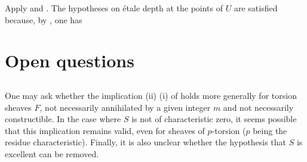 Apply  and . The hypotheses on \'{e}tale depth at the points of $U$ are satisfied because, by , one has 
\enlargethispage{\baselineskip}%

\section{Open questions} \label{XIV.6}

\subsection{} \label{XIV.6.1} One may ask whether the implication \textup{(ii)} \ALORS \textup{(i)} of  holds more generally for torsion sheaves $F$, not necessarily annihilated by a given integer $m$ and not necessarily constructible\pageoriginale. In the case where $S$ is not of characteristic zero, it seems possible that this implication remains valid, even for sheaves of $p$-torsion ($p$ being the residue characteristic). Finally, it is also unclear whether the hypothesis that $S$ is excellent can be removed.

